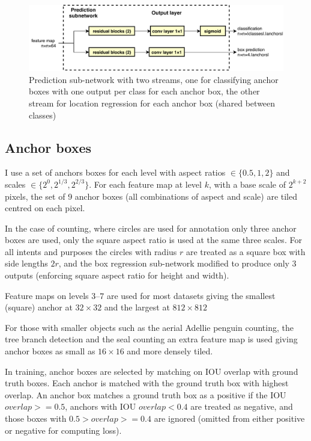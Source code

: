 \begin{figure}
  \centering
  \includegraphics[width=1.0\linewidth]{figures/annotation/prediction_subnet.pdf}
  \caption{Prediction sub-network with two streams, one for classifying anchor boxes with one output per class for each anchor box, the other stream for location regression for each anchor box (shared between classes)}    
  \label{fig:prediction_subnet}  
\end{figure}


\subsection{Anchor boxes}



I use a set of anchors boxes for each level with aspect ratios $ \in \{0.5, 1, 2\} $ and scales $ \in \{2^0, 2^{1/3}, 2^{2/3}\} $. For each feature map at level $k$, with a base scale of $ 2^{k + 2} $ pixels, the set of 9 anchor boxes (all combinations of aspect and scale) are tiled centred on each pixel. 

In the case of counting, where circles are used for annotation only three anchor boxes are used, only the square aspect ratio is used at the same three scales. For all intents and purposes the circles with radius $r$ are treated as a square box with side lengths $2r$, and the box regression sub-network modified to produce only $3$ outputs (enforcing square aspect ratio for height and width).

Feature maps on levels $3$--$7$ are used for most datasets giving the smallest (square) anchor at $32\times32$ and the largest at $812\times812$ 

For those with smaller objects such as the aerial Adellie penguin counting, the tree branch detection and the seal counting an extra feature map is used giving anchor boxes as small as $16\times16$ and more densely tiled.

In training, anchor boxes are selected by matching on \gls{IOU} overlap with ground truth boxes. Each anchor is matched with the ground truth box with highest overlap. An anchor box matches a ground truth box as a positive if the IOU $ overlap >= 0.5 $, anchors with IOU $ overlap < 0.4 $ are treated as negative, and those boxes with $ 0.5 > overlap >= 0.4 $ are ignored (omitted from either positive or negative for computing loss).

